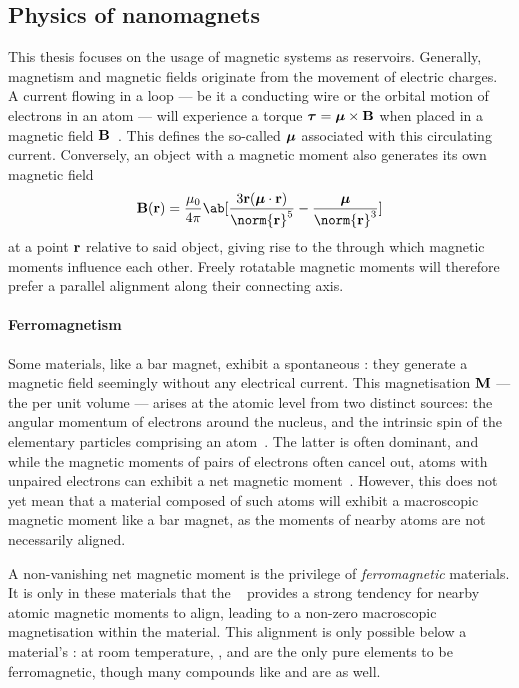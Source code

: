 \subsection{Physics of nanomagnets}
This thesis focuses on the usage of magnetic systems as reservoirs.
Generally, magnetism and magnetic fields originate from the movement of electric charges.
A current flowing in a loop --- be it a conducting wire or the orbital motion of electrons in an atom --- will experience a torque $\boldsymbol{\mathbf{\tau}} = \boldsymbol{\mathbf{\mu}} \times \boldsymbol{\mathbf{B}}$ when placed in a magnetic field $\boldsymbol{\mathbf{B}}$~\cite{IntroMagneticMaterials}.
This defines the so-called  $\boldsymbol{\mathbf{\mu}}$ associated with this circulating current.
Conversely, an object with a magnetic moment also generates its own magnetic field
\begin{equation}
	\vc{B}(\vc{r}) = \frac{\mu_0}{4 \pi} \ab[\frac{3 \vc{r} (\vc{\mu} \cdot \vc{r})}{\norm{\vc{r}}^5} - \frac{\vc{\mu}}{\norm{\vc{r}}^3}]
\end{equation}
at a point $\boldsymbol{\mathbf{r}}$ relative to said object, giving rise to the  through which magnetic moments influence each other. %
Freely rotatable magnetic moments will therefore prefer a parallel alignment along their connecting axis.

\paragraph{Ferromagnetism}
Some materials, like a bar magnet, exhibit a spontaneous : they generate a magnetic field seemingly without any electrical current.
This magnetisation $\boldsymbol{\mathbf{M}}$ --- the  per unit volume --- arises at the atomic level from two distinct sources: the angular momentum of electrons around the nucleus, and the intrinsic spin of the elementary particles comprising an atom~\cite{coey2010magnetism}.
The latter is often dominant, and while the magnetic moments of pairs of electrons often cancel out, atoms with unpaired electrons can exhibit a net magnetic moment~\cite{PhD_Leliaert}. %
However, this does not yet mean that a material composed of such atoms will exhibit a macroscopic magnetic moment like a bar magnet, as the moments of nearby atoms are not necessarily aligned. \par
A non-vanishing net magnetic moment is the privilege of \emph{ferromagnetic} materials.
It is only in these materials that the ~\cite{heisenberg1928theorie} provides a strong tendency for nearby atomic magnetic moments to align, leading to a non-zero macroscopic magnetisation within the material.
This alignment is only possible below a material's : at room temperature, ,  and  are the only pure elements to be ferromagnetic, though many compounds like  and  are as well.

